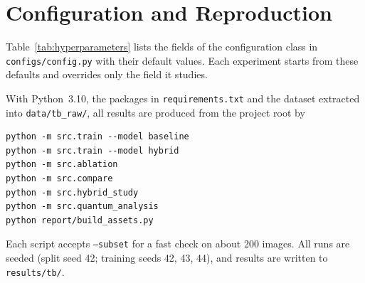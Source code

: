 \chapter{Configuration and Reproduction}
\label{app:config}
Table~\ref{tab:hyperparameters} lists the fields of the configuration class
in \texttt{configs/config.py} with their default values. Each experiment
starts from these defaults and overrides only the field it studies.



\label{app:reproduce}
With Python~3.10, the packages in \texttt{requirements.txt} and the dataset
extracted into \texttt{data/tb\_raw/}, all results are produced from the
project root by

\begin{verbatim}
python -m src.train --model baseline
python -m src.train --model hybrid
python -m src.ablation
python -m src.compare
python -m src.hybrid_study
python -m src.quantum_analysis
python report/build_assets.py
\end{verbatim}

\noindent Each script accepts \texttt{--subset} for a fast check on about 200
images. All runs are seeded (split seed 42; training seeds 42, 43, 44), and
results are written to \texttt{results/tb/}.
